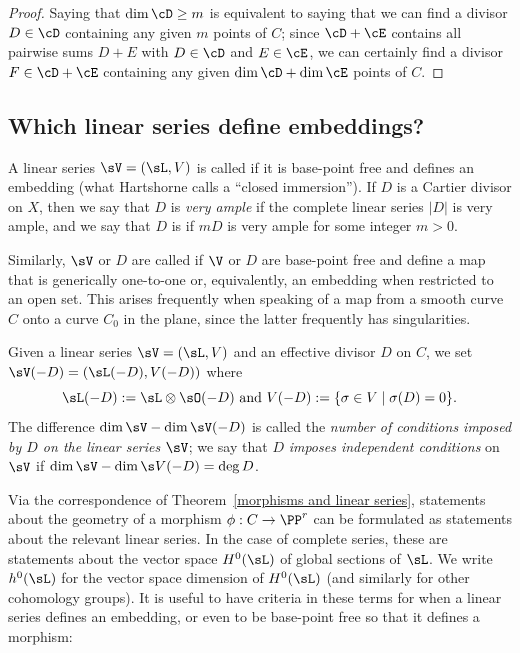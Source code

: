 \begin{proof}
Saying that
$\dim \cD \geq m$ is equivalent to saying that we can find a divisor
$D \in \cD$ containing any given $m$ points of $C$; since $\cD + \cE$
contains all pairwise sums $D + E$ with $D \in \cD$ and $E \in \cE$,
we can certainly find a divisor $F \in \cD + \cE$ containing any given
$\dim \cD + \dim \cE$ points of $C$. 
\end{proof}

\subsection*{Which linear series define embeddings?}

A linear series $\sV = (\sL, V)$ is called  
%
if it is base-point free and defines an embedding (what Hartshorne
calls a ``closed immersion''). If $D$ is a Cartier divisor on $X$,
then we say that $D$ is \emph{very ample} if the complete linear
series $|D|$ is very ample, and we say that $D$ is 
% 
if
$mD$ is very ample for some integer $m>0$.  

Similarly, $\sV$ or $D$ are called 
%
if $\V$ or $D$ are base-point free and define a map that is generically one-to-one or, equivalently,
an embedding when restricted to an open set. This arises frequently when speaking of a map from a smooth
curve $C$ onto a curve $C_{0}$ in the plane, since the latter frequently has singularities.

Given a linear series $\sV = (\sL, V)$ and an effective divisor $D$ on $C$, we  set
$
\sV(-D) = (\sL(-D),V(-D))
$
where
$$
\sL(-D): = \sL \otimes \sO(-D)\hbox{ and } V(-D) := \{ \sigma \in V \mid \sigma(D) = 0 \}.
$$
The difference $\dim \sV - \dim \sV(-D)$ is called the \emph{number of conditions imposed by $D$ on the linear series $\sV$}; we say that $D$ \emph{imposes independent conditions} on $\sV$ if $\dim \sV - \dim \s V(-D) = \deg D$.

Via the correspondence of Theorem~\ref{morphisms and linear series}, statements about the geometry of a morphism $\phi : C \to \PP^r$ can be formulated as statements about the relevant linear series. In the case of complete series, these are statements about the vector space $H^{0}(\sL)$ of global sections of $\sL$. We write $h^{0}(\sL)$ for the vector space dimension of $H^0(\sL)$ (and similarly for other cohomology groups). It is useful to have criteria
in these terms for when a linear series defines an embedding, or even to be base-point free so that it
defines a morphism:

